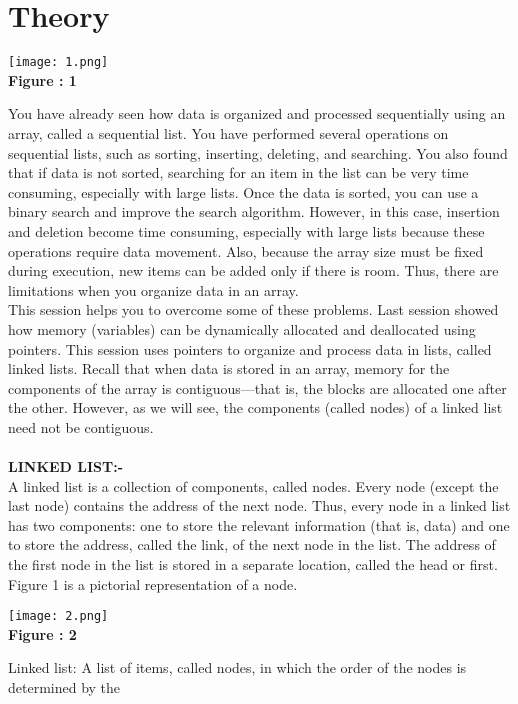 \documentclass[11pt]{article}            %
\begin{document}
\section{Theory }        
\begin{center}
 \texttt{[image: 1.png]}\\ 
\textbf{Figure : 1}
\vskip 0.5cm
\end{center}
  You have already seen how data is organized and processed sequentially using an array, called
a sequential list. You have performed several operations on sequential lists, such as sorting,
inserting, deleting, and searching. You also found that if data is not sorted, searching for an
item in the list can be very time consuming, especially with large lists. Once the data is sorted,
you can use a binary search and improve the search algorithm. However, in this case, insertion
and deletion become time consuming, especially with large lists because these operations
require data movement. Also, because the array size must be fixed during execution, new items
can be added only if there is room. Thus, there are limitations when you organize data in an
array.\\
This session helps you to overcome some of these problems. Last session showed how memory
(variables) can be dynamically allocated and deallocated using pointers. This session uses
pointers to organize and process data in lists, called linked lists. Recall that when data is stored
in an array, memory for the components of the array is contiguous—that is, the blocks are
allocated one after the other. However, as we will see, the components (called nodes) of a linked
list need not be contiguous.\\ \\
\textbf{LINKED LIST:-  }\\ 
A linked list is a collection of components, called nodes. Every node (except the last node)
contains the address of the next node. Thus, every node in a linked list has two components:
one to store the relevant information (that is, data) and one to store the address, called the link,
of the next node in the list. The address of the first node in the list is stored in a separate location,
called the head or first. Figure 1 is a pictorial representation of a node.  \\ 
\begin{center}
 \texttt{[image: 2.png]}\\ 
\textbf{Figure : 2}
\vskip 0.5cm
\end{center}
Linked list: A list of items, called nodes, in which the order of the nodes is determined by the
\end{document}
